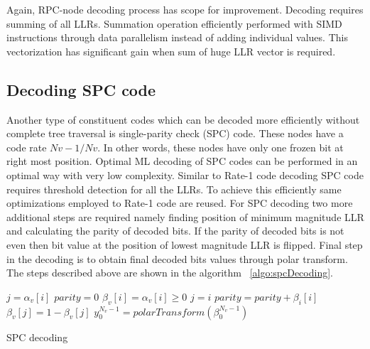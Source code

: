 Again, RPC-node decoding process has scope for improvement. Decoding requires summing of all LLRs. Summation operation efficiently performed with SIMD instructions through data parallelism instead of adding individual values. This vectorization has significant gain when sum of huge LLR vector is required.

\subsection{Decoding SPC code}
Another type of constituent codes which can be decoded more efficiently without complete tree traversal is single-parity check (SPC) code. These nodes have a code rate $Nv-1/Nv$. In other words, these nodes have only one frozen bit at right most position. Optimal ML decoding of SPC codes can be performed in an optimal way with very low complexity. Similar to Rate-1 code decoding SPC code requires threshold detection for all the LLRs. To achieve this efficiently same optimizations employed to Rate-1 code are reused. For SPC decoding two more additional steps are required namely finding position of minimum magnitude LLR and calculating the parity of decoded bits. If the parity of decoded bits is not even then bit value at the position of lowest magnitude LLR is flipped. Final step in the decoding is to obtain final decoded bits values through polar transform. The steps described above are shown in the algorithm ~\ref{algo:spcDecoding}.

\IncMargin{1.5em}
\begin{algorithm}[]
	 {
			$j = \alpha_{v}[i]$ \;
			$parity = 0$ \;
			 {
				$\beta_{v}[i] = \alpha_{v}[i] \ge 0$\;
				 {
					$j = i$ \;
				}
				$parity = parity + \beta_{\textit{i}}[i]$ \;
			}
		 {
			$\beta_{v}[j] = 1 - \beta_{v}[j]$\;
		}
		$y_{0}^{N_v-1} = polarTransform(\beta_{0}^{N_v-1})$ \;
		}
	\caption{SPC decoding}
	\label{algo:spcDecoding}
\end{algorithm}
\DecMargin{1.5em}

